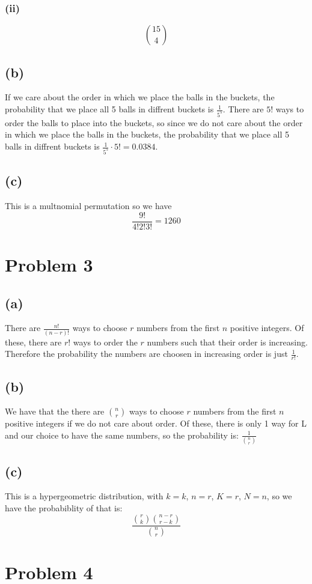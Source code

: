 \subsubsection*{(ii)}
$$\boxed{15 \choose 4}$$
\subsection*{(b)}
If we care about the order in which we place the balls in the buckets, the probability that we place all 5 balls in diffrent buckets is $\frac{1}{5^5}$.
There are $5!$ ways to order the balls to place into the buckets, so since we do not care about
the order in which we place the balls in the buckets, the probability that we place all 5 balls in diffrent buckets is $\frac{1}{5^5}\cdot5!=0.0384
$.
\subsection*{(c)}
This is a multnomial permutation so we have
$$\frac{9!}{4!2!3!}=\boxed{1260}$$

\section*{Problem 3}
\subsection*{(a)}
There are $\frac{n!}{(n-r)!}$ ways to choose $r$ numbers from the first $n$
positive integers. Of these, there are $r!$ ways to order the $r$ numbers
such that their order is increasing. Therefore the probability the numbers are choosen in increasing order
is just $\boxed{\frac{1}{r!}}$.
\subsection*{(b)}
We have that the there are $n\choose r$ ways to choose
$r$ numbers from the first $n$ positive integers if we 
do not care about order.
Of these, there is only 1 way for L and our choice to have the same
numbers, so the probability is: $\boxed{\frac{1}{{n\choose r}}}$
\subsection*{(c)}
This is a hypergeometric distribution, with $k=k$, $n=r$, $K=r$, $N=n$, 
so we have the probabiblity of that is:
$$\boxed{\frac{{r\choose k}{n-r\choose r-k}}{{n\choose r}}}$$
\section*{Problem 4}
